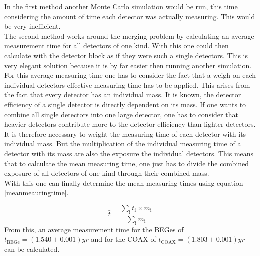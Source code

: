 \documentclass[encoding=utf8,british]{tumphthesis}
\begin{document}
In the first method another Monte Carlo simulation would be run, this time considering the amount of time each detector was actually measuring.
This would be very inefficient.
\\

The second method works around the merging problem by calculating an average measurement time for all detectors of one kind.
With this one could then calculate with the detector block as if they were such a single detectors.
This is very elegant solution because it is by far easier then running another simulation.
\\

For this average measuring time one has to consider the fact that a weigh on each individual detectors effective measuring time has to be applied.
This arises from the fact that every detector has an individual mass.
It is known, the detector efficiency of a single detector is directly dependent on its mass.
If one wants to combine all single detectors into one large detector, one has to consider that heavier detectors contribute more to the detector efficiency than lighter detectors.
It is therefore necessary to weight the measuring time of each detector with its individual mass.
But the multiplication of the individual measuring time of a detector with its mass are also the exposure the individual detectors.
This means that to calculate the mean measuring time, one just has to divide the combined exposure of all detectors of one kind through their combined mass.
\\

With this one can finally determine the mean measuring times using equation \ref{meanmeauringtime}.

\begin{equation*}
    \bar{t} = \frac{\sum_\mathrm{i} t_\mathrm{i} \times m_\mathrm{i}}{\sum_\mathrm{i} m_\mathrm{i}}
\label{meanmeauringtime}
\end{equation*}
From this, an average measurement time for the BEGes of $\bar{t}_{\mathrm{BEGe}} = (1.540\pm0.001)\unit{yr}$ and for the COAX of $\bar{t}_{\mathrm{COAX}} = (1.803\pm0.001)\unit{yr}$ can be calculated.
\\
\fi
\end{document}
